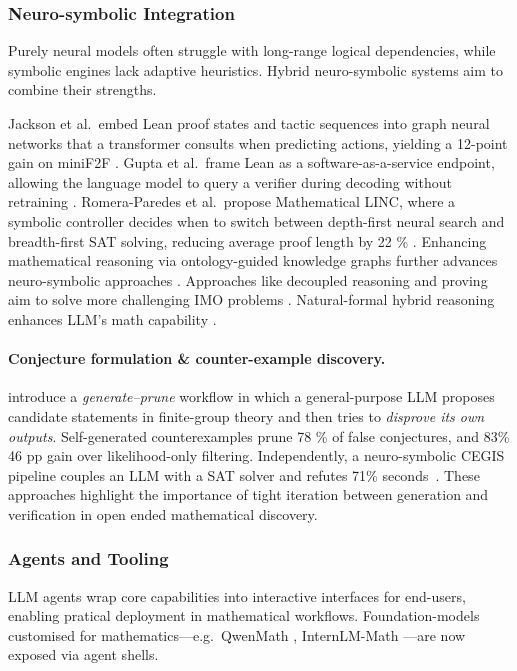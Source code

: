 \documentclass[acmsmall,anonymous]{acmart}
\begin{document}
\subsubsection{Neuro-symbolic Integration}\label{sec:neurosym}
Purely neural models often struggle with long-range logical dependencies, while symbolic engines lack adaptive heuristics. Hybrid neuro-symbolic systems aim to combine their strengths.

Jackson et al.\ embed Lean proof states and tactic sequences into graph neural networks that a transformer consults when predicting actions, yielding a 12-point gain on miniF2F \cite{jackson2024neurosymbolic}.  Gupta et al.\ frame Lean as a software-as-a-service endpoint, allowing the language model to query a verifier during decoding without retraining \cite{gupta2024saas}.  Romera-Paredes et al.\ propose Mathematical LINC, where a symbolic controller decides when to switch between depth-first neural search and breadth-first SAT solving, reducing average proof length by 22 \% \cite{romera2024mathematical}. Enhancing mathematical reasoning via ontology-guided knowledge graphs further advances neuro-symbolic approaches \cite{chen2024enhancingmathematicalreasoningllms}. Approaches like decoupled reasoning and proving aim to solve more challenging IMO problems \cite{liang2025imo}. Natural-formal hybrid reasoning enhances LLM's math capability \cite{wang2025letsreasonformally}.

\paragraph{Conjecture formulation \& counter-example discovery.}
\citet{chuharski2024mining} introduce a \emph{generate–prune} workflow
in which a general-purpose LLM proposes candidate statements in
finite-group theory and then tries to \emph{disprove its own outputs}.
Self-generated counterexamples prune 78 \% of false conjectures, and
83\% %
46 pp gain over likelihood-only filtering. Independently, a
neuro-symbolic CEGIS pipeline couples an LLM with a SAT solver and
refutes 71\% %
seconds~\cite{jha2023neurosymbolic}. These approaches highlight the importance of tight iteration between generation and verification in open ended mathematical discovery. 


\subsubsection{Agents and Tooling}\label{sec:agents}
LLM agents wrap core capabilities into interactive interfaces for end-users, enabling pratical deployment in mathematical workflows. Foundation-models customised for mathematics—e.g.\ QwenMath \cite{yang2024qwenmath}, InternLM-Math \cite{ying2024 b internlm}—are now exposed via agent shells.
\end{document}
